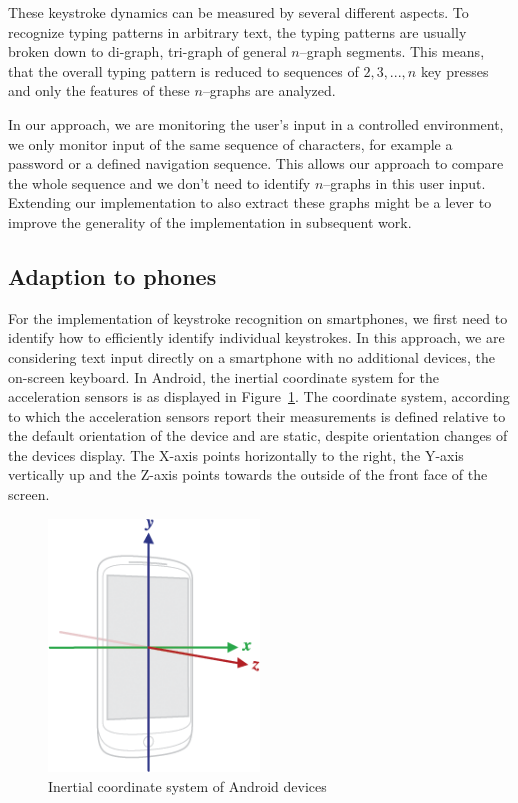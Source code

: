 These keystroke dynamics can be measured by several different aspects. To recognize typing patterns in arbitrary text, the typing patterns are usually broken down to di-graph, tri-graph of general $n$--graph segments. This means, that the overall typing pattern is reduced to sequences of $2, 3, ..., n$ key presses and only the features of these $n$--graphs are analyzed.

In our approach, we are monitoring the user's input in a controlled environment, \ie we only monitor input of the same sequence of characters, for example a password or a defined navigation sequence. This allows our approach to compare the whole sequence and we don't need to identify $n$--graphs in this user input. Extending our implementation to also extract these graphs might be a lever to improve the generality of the implementation in subsequent work.

\subsection{Adaption to phones}\label{subsection:phones}
For the implementation of keystroke recognition on smartphones, we first need to identify how to efficiently identify individual keystrokes. In this approach, we are considering text input directly on a smartphone with no additional devices, \ie the on-screen keyboard.
In Android, the inertial coordinate system for the acceleration sensors is as displayed in Figure~\ref{fig:deviceaxis}. The coordinate system, according to which the acceleration sensors report their measurements is defined relative to the default orientation of the device and are static, despite orientation changes of the devices display. The X-axis points horizontally to the right, the Y-axis vertically up and the Z-axis points towards the outside of the front face of the screen\cite{sensoreventandroidreference}.

\begin{figure}
    \centering
    \includegraphics[width=0.5\textwidth]{figures/axis_device.png}
    \caption{Inertial coordinate system of Android devices\cite{sensoreventandroidreference}}
    \label{fig:deviceaxis}
\end{figure}

